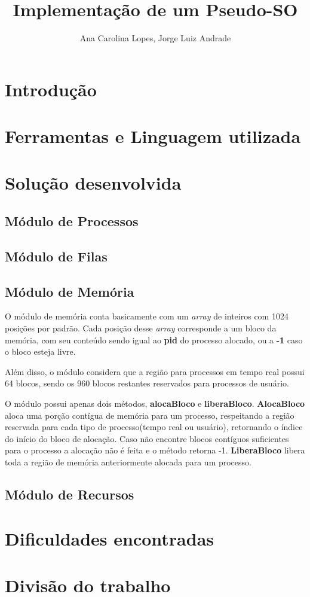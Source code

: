 \documentclass[a4paper]{article}
\title{Implementação de um Pseudo-SO}
\author{Ana Carolina Lopes, Jorge Luiz Andrade}
\date{}
\begin{document}
\maketitle

\section{Introdução}

\section{Ferramentas e Linguagem utilizada}

\section{Solução desenvolvida}
\subsection{Módulo de Processos}

\subsection{Módulo de Filas}

\subsection{Módulo de Memória}
	O módulo de memória conta basicamente com um \emph{array} de inteiros com 1024 posições por padrão. Cada posição desse \emph{array} corresponde a um bloco da memória, com seu conteúdo sendo igual ao \textbf{pid} do processo alocado, ou a \textbf{-1} caso o bloco esteja livre.
	
	Além disso, o módulo considera que a região para processos em tempo real possui 64 blocos, sendo os 960 blocos restantes reservados para processos de usuário.
	
	O módulo possui apenas dois métodos, \textbf{alocaBloco} e \textbf{liberaBloco}. \textbf{AlocaBloco} aloca uma porção contígua de memória para um processo, respeitando a região reservada para cada tipo de processo(tempo real ou usuário), retornando o índice do início do bloco de alocação. Caso não encontre blocos contíguos suficientes para o processo a alocação não é feita e o método retorna -1. \textbf{LiberaBloco} libera toda a região de memória anteriormente alocada para um processo.

\subsection{Módulo de Recursos}

\section{Dificuldades encontradas}

\section{Divisão do trabalho}


\end{document}
